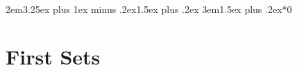 \documentclass{report}
\begin{document}

\titleformat{\subsection}[block]{}{\thesubsection}{1em}{}
\titleformat{\subsubsection}[block]{}{\thesubsubsection}{1em}{}
\titlespacing*{\subsection} {2em}{3.25ex plus 1ex minus .2ex}{1.5ex plus .2ex}
\titlespacing*{\subsubsection} {3em}{1.5ex plus .2ex}{*0}

\newpage

\section*{First Sets}
\end{document}
